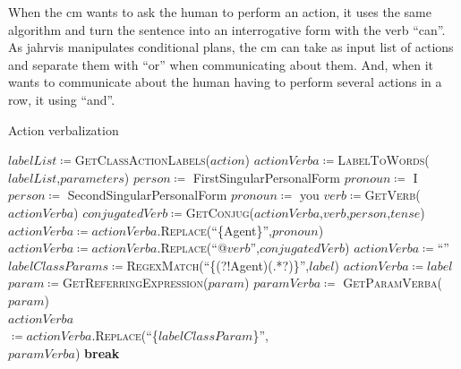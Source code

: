 \documentclass[a4paper,11pt,twoside]{StyleThese}
\begin{document}
When the \acrshort{cm} wants to ask the human to perform an action, it uses the same algorithm and turn the sentence into an interrogative form with the verb ``can''. As \acrshort{jahrvis} manipulates conditional plans, the \acrshort{cm} can take as input list of actions and separate them with ``or'' when communicating about them. And, when it wants to communicate about the human having to perform several actions in a row, it using ``and''.
 
\begin{algorithm}[!htb]
	\caption{Action verbalization}
	\label{chap6:algo:action_verba}
	\begin{algorithmic}
	\State $labelList \coloneqq$\textsc{GetClassActionLabels($action$)}
	\State $actionVerba \coloneqq$\textsc{LabelToWords}($labelList$,$parameters$)
		\State $person \coloneqq$ FirstSingularPersonalForm
		\State $pronoun \coloneqq$ I
		\State $person \coloneqq$ SecondSingularPersonalForm
		\State $pronoun \coloneqq$ you
	\EndIf
	\State $verb \coloneqq$\textsc{GetVerb}($actionVerba$)
	\State $conjugatedVerb \coloneqq$\textsc{GetConjug}($actionVerba$,$verb$,$person$,$tense$)
	\State $actionVerba \coloneqq actionVerba.$\textsc{Replace}(``\{Agent\}'',$pronoun$)
	\State $actionVerba \coloneqq actionVerba.$\textsc{Replace}(``@$verb$'',$conjugatedVerb$)
	\EndFunction
	\Statex
	\State $actionVerba \coloneqq$``''
		\State $labelClassParams \coloneqq$\textsc{RegexMatch}(``\{(?!Agent)(.*?)\}'',$label$)
			 
					\State $actionVerba \coloneqq label$
				\EndIf
					\State $param \coloneqq$\textsc{GetReferringExpression($param$)}
				\Else
					\State $paramVerba \coloneqq$ \textsc{GetParamVerba($param$)}\\\hfill{}
				\EndIf
				\State $actionVerba$ \\\hfill $\coloneqq actionVerba.$\textsc{Replace}(``\{$labelClassParam$\}'',\\\hfill$paramVerba$)
				\State \textbf{break}
			\EndIf
			\EndFor
		\EndFor
		\EndIf
	\EndFor
	\EndFunction
	\end{algorithmic}
\end{algorithm}	
	
\end{document}
